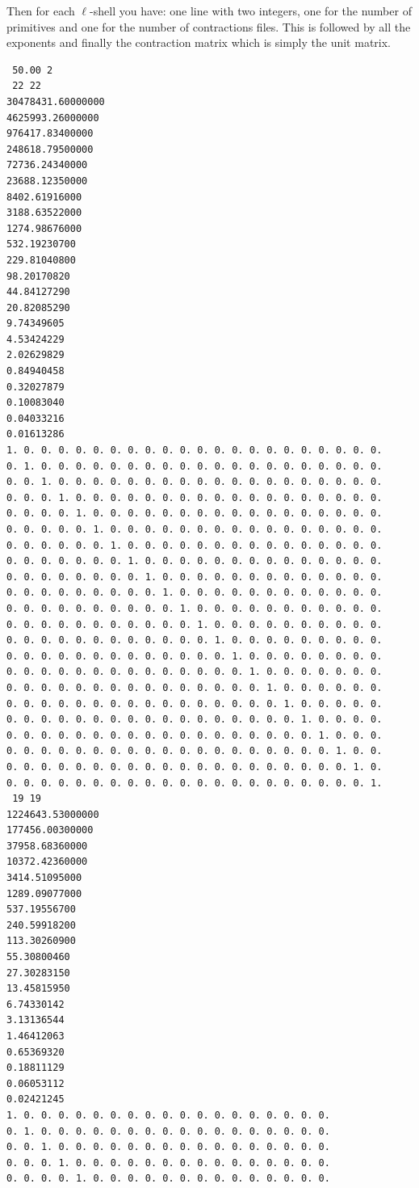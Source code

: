 \documentclass[a4paper,fleqn]{article}
\begin{document}
Then for each $\ell$-shell you have:
one line with two integers, one for the number of primitives and one for the
number of contractions files. This is followed by all the exponents
and finally the contraction matrix which is simply the unit matrix.
\begin{verbatim}
 50.00 2
 22 22
30478431.60000000
4625993.26000000
976417.83400000
248618.79500000
72736.24340000
23688.12350000
8402.61916000
3188.63522000
1274.98676000
532.19230700
229.81040800
98.20170820
44.84127290
20.82085290
9.74349605
4.53424229
2.02629829
0.84940458
0.32027879
0.10083040
0.04033216
0.01613286
1. 0. 0. 0. 0. 0. 0. 0. 0. 0. 0. 0. 0. 0. 0. 0. 0. 0. 0. 0. 0. 0. 
0. 1. 0. 0. 0. 0. 0. 0. 0. 0. 0. 0. 0. 0. 0. 0. 0. 0. 0. 0. 0. 0. 
0. 0. 1. 0. 0. 0. 0. 0. 0. 0. 0. 0. 0. 0. 0. 0. 0. 0. 0. 0. 0. 0. 
0. 0. 0. 1. 0. 0. 0. 0. 0. 0. 0. 0. 0. 0. 0. 0. 0. 0. 0. 0. 0. 0. 
0. 0. 0. 0. 1. 0. 0. 0. 0. 0. 0. 0. 0. 0. 0. 0. 0. 0. 0. 0. 0. 0. 
0. 0. 0. 0. 0. 1. 0. 0. 0. 0. 0. 0. 0. 0. 0. 0. 0. 0. 0. 0. 0. 0. 
0. 0. 0. 0. 0. 0. 1. 0. 0. 0. 0. 0. 0. 0. 0. 0. 0. 0. 0. 0. 0. 0. 
0. 0. 0. 0. 0. 0. 0. 1. 0. 0. 0. 0. 0. 0. 0. 0. 0. 0. 0. 0. 0. 0. 
0. 0. 0. 0. 0. 0. 0. 0. 1. 0. 0. 0. 0. 0. 0. 0. 0. 0. 0. 0. 0. 0. 
0. 0. 0. 0. 0. 0. 0. 0. 0. 1. 0. 0. 0. 0. 0. 0. 0. 0. 0. 0. 0. 0. 
0. 0. 0. 0. 0. 0. 0. 0. 0. 0. 1. 0. 0. 0. 0. 0. 0. 0. 0. 0. 0. 0. 
0. 0. 0. 0. 0. 0. 0. 0. 0. 0. 0. 1. 0. 0. 0. 0. 0. 0. 0. 0. 0. 0. 
0. 0. 0. 0. 0. 0. 0. 0. 0. 0. 0. 0. 1. 0. 0. 0. 0. 0. 0. 0. 0. 0. 
0. 0. 0. 0. 0. 0. 0. 0. 0. 0. 0. 0. 0. 1. 0. 0. 0. 0. 0. 0. 0. 0. 
0. 0. 0. 0. 0. 0. 0. 0. 0. 0. 0. 0. 0. 0. 1. 0. 0. 0. 0. 0. 0. 0. 
0. 0. 0. 0. 0. 0. 0. 0. 0. 0. 0. 0. 0. 0. 0. 1. 0. 0. 0. 0. 0. 0. 
0. 0. 0. 0. 0. 0. 0. 0. 0. 0. 0. 0. 0. 0. 0. 0. 1. 0. 0. 0. 0. 0. 
0. 0. 0. 0. 0. 0. 0. 0. 0. 0. 0. 0. 0. 0. 0. 0. 0. 1. 0. 0. 0. 0. 
0. 0. 0. 0. 0. 0. 0. 0. 0. 0. 0. 0. 0. 0. 0. 0. 0. 0. 1. 0. 0. 0. 
0. 0. 0. 0. 0. 0. 0. 0. 0. 0. 0. 0. 0. 0. 0. 0. 0. 0. 0. 1. 0. 0. 
0. 0. 0. 0. 0. 0. 0. 0. 0. 0. 0. 0. 0. 0. 0. 0. 0. 0. 0. 0. 1. 0. 
0. 0. 0. 0. 0. 0. 0. 0. 0. 0. 0. 0. 0. 0. 0. 0. 0. 0. 0. 0. 0. 1. 
 19 19
1224643.53000000
177456.00300000
37958.68360000
10372.42360000
3414.51095000
1289.09077000
537.19556700
240.59918200
113.30260900
55.30800460
27.30283150
13.45815950
6.74330142
3.13136544
1.46412063
0.65369320
0.18811129
0.06053112
0.02421245
1. 0. 0. 0. 0. 0. 0. 0. 0. 0. 0. 0. 0. 0. 0. 0. 0. 0. 0. 
0. 1. 0. 0. 0. 0. 0. 0. 0. 0. 0. 0. 0. 0. 0. 0. 0. 0. 0. 
0. 0. 1. 0. 0. 0. 0. 0. 0. 0. 0. 0. 0. 0. 0. 0. 0. 0. 0. 
0. 0. 0. 1. 0. 0. 0. 0. 0. 0. 0. 0. 0. 0. 0. 0. 0. 0. 0. 
0. 0. 0. 0. 1. 0. 0. 0. 0. 0. 0. 0. 0. 0. 0. 0. 0. 0. 0. 

\end{verbatim}
\end{document}
